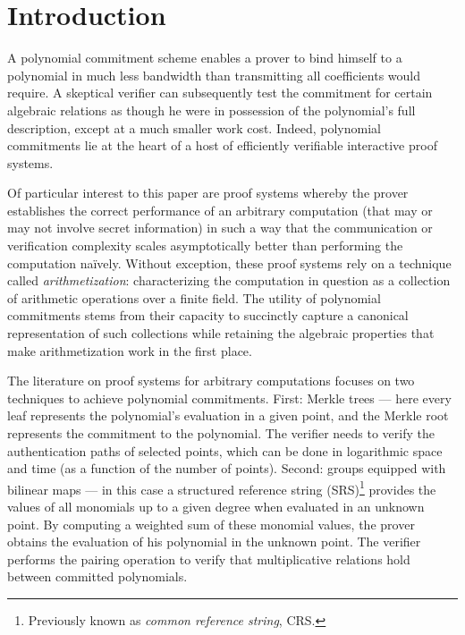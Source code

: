 
\section{Introduction}

A polynomial commitment scheme enables a prover to bind himself to a polynomial in much less bandwidth than transmitting all coefficients would require. A skeptical verifier can subsequently test the commitment for certain algebraic relations as though he were in possession of the polynomial's full description, except at a much smaller work cost. Indeed, polynomial commitments lie at the heart of a host of efficiently verifiable interactive proof systems.

Of particular interest to this paper are proof systems whereby the prover establishes the correct performance of an arbitrary computation (that may or may not involve secret information) in such a way that the communication or verification complexity scales asymptotically better than performing the computation naïvely. Without exception, these proof systems rely on a technique called \emph{arithmetization}: characterizing the computation in question as a collection of arithmetic operations over a finite field. The utility of polynomial commitments stems from their capacity to succinctly capture a canonical representation of such collections while retaining the algebraic properties that make arithmetization work in the first place.

The literature on proof systems for arbitrary computations focuses on two techniques to achieve polynomial commitments. First: Merkle trees --- here every leaf represents the polynomial's evaluation in a given point, and the Merkle root represents the commitment to the polynomial. The verifier needs to verify the authentication paths of selected points, which can be done in logarithmic space and time (as a function of the number of points). Second: groups equipped with bilinear maps --- in this case a structured reference string (SRS)\footnote{Previously known as \emph{common reference string}, CRS.} provides the values of all monomials up to a given degree when evaluated in an unknown point. By computing a weighted sum of these monomial values, the prover obtains the evaluation of his polynomial in the unknown point. The verifier performs the pairing operation to verify that multiplicative relations hold between committed polynomials.


